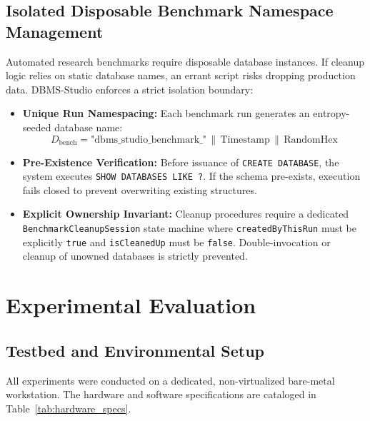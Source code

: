 \documentclass[conference]{IEEEtran}
\begin{document}
\subsection{Isolated Disposable Benchmark Namespace Management}
Automated research benchmarks require disposable database instances. If cleanup logic relies on static database names, an errant script risks dropping production data. DBMS-Studio enforces a strict isolation boundary:
\begin{itemize}
    \item \textbf{Unique Run Namespacing:} Each benchmark run generates an entropy-seeded database name:
    \begin{equation}
        D_{\text{bench}} = \text{"dbms\_studio\_benchmark\_"} \,\|\, \text{Timestamp} \,\|\, \text{RandomHex}
    \end{equation}
    \item \textbf{Pre-Existence Verification:} Before issuance of \texttt{CREATE DATABASE}, the system executes \texttt{SHOW DATABASES LIKE ?}. If the schema pre-exists, execution fails closed to prevent overwriting existing structures.
    \item \textbf{Explicit Ownership Invariant:} Cleanup procedures require a dedicated \texttt{BenchmarkCleanupSession} state machine where \texttt{createdByThisRun} must be explicitly \texttt{true} and \texttt{isCleanedUp} must be \texttt{false}. Double-invocation or cleanup of unowned databases is strictly prevented.
\end{itemize}

\section{Experimental Evaluation}

\subsection{Testbed and Environmental Setup}
All experiments were conducted on a dedicated, non-virtualized bare-metal workstation. The hardware and software specifications are cataloged in Table~\ref{tab:hardware_specs}.
\end{document}
